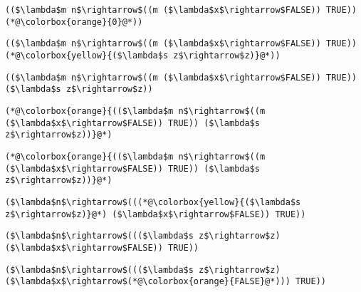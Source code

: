 \documentclass{beamer}
\begin{document}
\begin{frame}[fragile]{\CurrentSection}
\lstset{basicstyle=\ttfamily\small}\lstset{numbers=none}\lstset{language=ML}\begin{lstlisting}
(($\lambda$m n$\rightarrow$((m ($\lambda$x$\rightarrow$FALSE)) TRUE)) (*@\colorbox{orange}{0}@*))
\end{lstlisting}
\pause\lstset{language=ML}\begin{lstlisting}
(($\lambda$m n$\rightarrow$((m ($\lambda$x$\rightarrow$FALSE)) TRUE)) (*@\colorbox{yellow}{($\lambda$s z$\rightarrow$z)}@*))
\end{lstlisting}

\end{frame}

\begin{frame}[fragile]{\CurrentSection}
\lstset{basicstyle=\ttfamily\small}\lstset{numbers=none}\lstset{language=ML}\begin{lstlisting}
(($\lambda$m n$\rightarrow$((m ($\lambda$x$\rightarrow$FALSE)) TRUE)) ($\lambda$s z$\rightarrow$z))
\end{lstlisting}
\pause\lstset{language=ML}\begin{lstlisting}
(*@\colorbox{orange}{(($\lambda$m n$\rightarrow$((m ($\lambda$x$\rightarrow$FALSE)) TRUE)) ($\lambda$s z$\rightarrow$z))}@*)
\end{lstlisting}

\end{frame}

\begin{frame}[fragile]{\CurrentSection}
\lstset{basicstyle=\ttfamily\small}\lstset{numbers=none}\lstset{language=ML}\begin{lstlisting}
(*@\colorbox{orange}{(($\lambda$m n$\rightarrow$((m ($\lambda$x$\rightarrow$FALSE)) TRUE)) ($\lambda$s z$\rightarrow$z))}@*)
\end{lstlisting}
\pause\lstset{language=ML}\begin{lstlisting}
($\lambda$n$\rightarrow$(((*@\colorbox{yellow}{($\lambda$s z$\rightarrow$z)}@*) ($\lambda$x$\rightarrow$FALSE)) TRUE))
\end{lstlisting}

\end{frame}

\begin{frame}[fragile]{\CurrentSection}
\lstset{basicstyle=\ttfamily\small}\lstset{numbers=none}\lstset{language=ML}\begin{lstlisting}
($\lambda$n$\rightarrow$((($\lambda$s z$\rightarrow$z) ($\lambda$x$\rightarrow$FALSE)) TRUE))
\end{lstlisting}
\pause\lstset{language=ML}\begin{lstlisting}
($\lambda$n$\rightarrow$((($\lambda$s z$\rightarrow$z) ($\lambda$x$\rightarrow$(*@\colorbox{orange}{FALSE}@*))) TRUE))
\end{lstlisting}

\end{frame}
\end{document}

